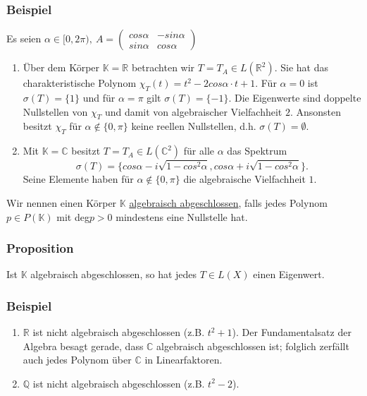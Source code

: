 \subsubsection{Beispiel}
Es seien $\alpha \in [0,2\pi ),\ A=\begin{pmatrix}cos \alpha & -sin \alpha\\ sin\alpha & cos\alpha \end{pmatrix}$
\begin{enumerate}
\item Über dem Körper $\mathbb{K}=\mathbb{R}$ betrachten wir $T=T_A\in L(\mathbb{R}^2)$.  Sie hat das charakteristische Polynom $\chi _T(t)=t^2-2cos\alpha \cdot t+1$.  Für $\alpha =0$ ist $\sigma (T)=\{1\}$ und für $\alpha = \pi$ gilt $\sigma (T)=\{-1\}$.  Die Eigenwerte sind doppelte Nullstellen von $\chi _T$ und damit von algebraischer Vielfachheit $2$.  Ansonsten besitzt $\chi _T$ für $\alpha \not\in \{0,\pi\}$ keine reellen Nullstellen, d.h. $\sigma (T)=\emptyset$.
\item Mit $\mathbb{K}=\mathbb{C}$ besitzt $T=T_A\in L(\mathbb{C}^2)$ für alle $\alpha$ das Spektrum
\[\sigma (T)=\{cos\alpha -i\sqrt{1-cos^2\alpha }, cos\alpha +i\sqrt{1-cos^2\alpha }\}.\]
Seine Elemente haben für $\alpha\not\in \{0,\pi \}$ die algebraische Vielfachheit $1$.
\end{enumerate}
Wir nennen einen Körper $\mathbb{K}$ \underline{algebraisch abgeschlossen}, falls jedes Polynom $p\in P(\mathbb{K})$ mit deg$p>0$ mindestens eine Nullstelle hat.
\subsubsection{Proposition}
Ist $\mathbb{K}$ algebraisch abgeschlossen, so hat jedes $T\in L(X)$ einen Eigenwert.
\subsubsection{Beispiel}
\begin{enumerate}
\item $\mathbb{R}$ ist nicht algebraisch abgeschlossen (z.B. $t^2 +1$).  Der Fundamentalsatz der Algebra besagt gerade, dass $\mathbb{C}$ algebraisch abgeschlossen ist; folglich zerfällt auch jedes Polynom über $\mathbb{C}$ in Linearfaktoren.
\item $\mathbb{Q}$ ist nicht algebraisch abgeschlossen (z.B. $t^2-2$).
\end{enumerate}
